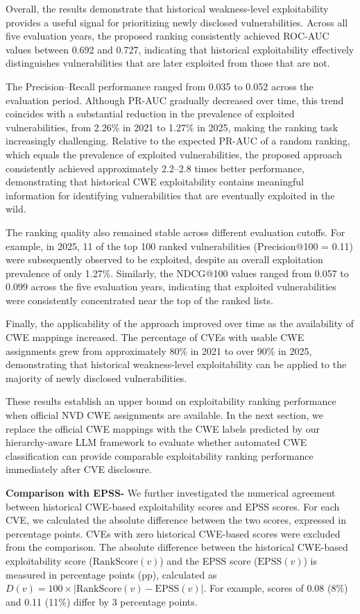 \documentclass[conference,compsoc]{IEEEtran}
\begin{document}
Overall, the results demonstrate that historical weakness-level exploitability provides a useful signal for prioritizing newly disclosed vulnerabilities. Across all five evaluation years, the proposed ranking consistently achieved ROC-AUC values between 0.692 and 0.727, indicating that historical exploitability effectively distinguishes vulnerabilities that are later exploited from those that are not.

The Precision--Recall performance ranged from 0.035 to 0.052 across the evaluation period. Although PR-AUC gradually decreased over time, this trend coincides with a substantial reduction in the prevalence of exploited vulnerabilities, from 2.26\% in 2021 to 1.27\% in 2025, making the ranking task increasingly challenging. Relative to the expected PR-AUC of a random ranking, which equals the prevalence of exploited vulnerabilities, the proposed approach consistently achieved approximately 2.2--2.8 times better performance, demonstrating that historical CWE exploitability contains meaningful information for identifying vulnerabilities that are eventually exploited in the wild.

The ranking quality also remained stable across different evaluation cutoffs. For example, in 2025, 11 of the top 100 ranked vulnerabilities (Precision@100 = 0.11) were subsequently observed to be exploited, despite an overall exploitation prevalence of only 1.27\%. Similarly, the NDCG@100 values ranged from 0.057 to 0.099 across the five evaluation years, indicating that exploited vulnerabilities were consistently concentrated near the top of the ranked lists.

Finally, the applicability of the approach improved over time as the availability of CWE mappings increased. The percentage of CVEs with usable CWE assignments grew from approximately 80\% in 2021 to over 90\% in 2025, demonstrating that historical weakness-level exploitability can be applied to the majority of newly disclosed vulnerabilities.

These results establish an upper bound on exploitability ranking performance when official NVD CWE assignments are available. 
In the next section, we replace the official CWE mappings with the CWE labels predicted by our hierarchy-aware LLM framework to evaluate whether automated CWE classification can provide comparable exploitability ranking performance immediately after CVE disclosure.


\textbf{Comparison with EPSS-} We further investigated the numerical agreement between historical CWE-based exploitability scores and EPSS scores. For each CVE,
we calculated the absolute difference between the two scores,
expressed in percentage points. CVEs with zero historical
CWE-based scores were excluded from the comparison. The absolute difference between the historical CWE-based exploitability score ($\mathrm{RankScore}(v)$) and the EPSS score ($\mathrm{EPSS}(v)$) is measured in percentage points (pp), calculated as $D(v)=100\times|\mathrm{RankScore}(v)-\mathrm{EPSS}(v)|$. For example, scores of 0.08 (8\%) and 0.11 (11\%) differ by 3 percentage points. 
\end{document}
